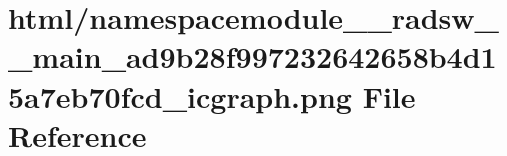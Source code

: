 \hypertarget{namespacemodule____radsw____main__ad9b28f997232642658b4d15a7eb70fcd__icgraph_8png}{}\section{html/namespacemodule\+\_\+\+\_\+radsw\+\_\+\+\_\+main\+\_\+ad9b28f997232642658b4d15a7eb70fcd\+\_\+icgraph.png File Reference}
\label{namespacemodule____radsw____main__ad9b28f997232642658b4d15a7eb70fcd__icgraph_8png}
